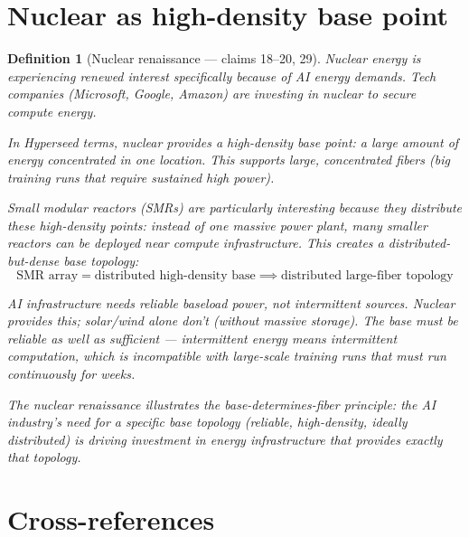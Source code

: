 \documentclass[11pt,a4paper]{article}
\newtheorem{definition}{Definition}[section]
\begin{document}

\section{Nuclear as high-density base point}
\label{sec:nuclear}

\begin{definition}[Nuclear renaissance --- claims 18--20, 29]
\label{def:nuclear}
Nuclear energy is experiencing renewed interest specifically because of
AI energy demands. Tech companies (Microsoft, Google, Amazon) are
investing in nuclear to secure compute energy.

In Hyperseed terms, nuclear provides a \emph{high-density base point}:
a large amount of energy concentrated in one location. This supports
large, concentrated fibers (big training runs that require sustained
high power).

Small modular reactors (SMRs) are particularly interesting because they
distribute these high-density points: instead of one massive power
plant, many smaller reactors can be deployed near compute infrastructure.
This creates a distributed-but-dense base topology:
\[
  \text{SMR array} = \text{distributed high-density base}
  \implies \text{distributed large-fiber topology}
\]

AI infrastructure needs reliable baseload power, not intermittent sources.
Nuclear provides this; solar/wind alone don't (without massive storage).
The base must be \emph{reliable} as well as sufficient --- intermittent
energy means intermittent computation, which is incompatible with
large-scale training runs that must run continuously for weeks.

The nuclear renaissance illustrates the base-determines-fiber principle:
the AI industry's need for a specific base topology (reliable, high-density,
ideally distributed) is driving investment in energy infrastructure that
provides exactly that topology.
\end{definition}


\section{Cross-references}
\end{document}
